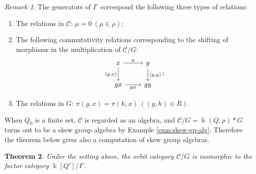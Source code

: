\documentclass{surv-l}
\numberwithin{equation}{chapter}
\numberwithin{figure}{chapter}
\theoremstyle{plain}
\newtheorem{thm}{Theorem}[section]
\theoremstyle{definition}
\theoremstyle{remark}
\newtheorem{rmk}[thm]{Remark}
\newcommand{\Ar}[3]{\ar[from={#1}, to={#2}, #3]}
\begin{document}
\begin{rmk}
The generators of $I'$ correspond the following three types of relations:
\begin{enumerate}
\item
The relations in ${\mathcal{C}}$: $\mu = 0 \ (\mu \in \rho)$;
\item
The following commutativity relations corresponding to
the shifting of morphisms in the multiplication of ${\mathcal{C}}/G$:
\[
\begin{tikzcd}
x & y\\
gx & gy
\Ar{1-1}{1-2}{"\alpha"}
\Ar{2-1}{2-2}{"g\alpha" '}
\Ar{1-1}{2-1}{"{(g,x)}" '}
\Ar{1-2}{2-2}{"{(g,y)}"}
\end{tikzcd};
\]
\item
The relations in $G$: $\pi(g,x) = \pi(h,x) \ ((g,h)\in R)$.
\end{enumerate}
\end{rmk}

When $Q_0$ is a finite set,
${\mathcal{C}}$ is regarded as an algebra, and ${\mathcal{C}}/G = \Bbbk(Q,\rho) * G$ turns out to be
a skew group algebra by Example \ref{exm:skew-gp-alg}.
Therefore the theorem below gives also a computation of skew group algebras.

\begin{thm}\label{quiver-presentation}
Under the setting above, the orbit category ${\mathcal{C}}/G$ is isomorphic to
the factor category $\Bbbk[Q']/I'$.
\end{thm}
\end{document}
